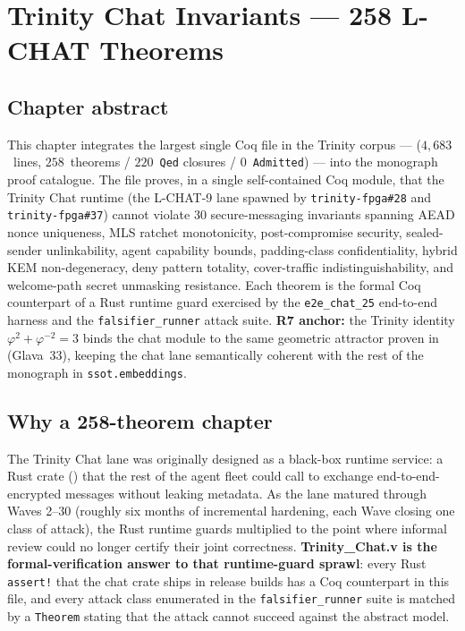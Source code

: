 \chapter{Trinity Chat Invariants --- 258 L-CHAT Theorems}
\label{ch:chat-invariants}

\section*{Chapter abstract}

This chapter integrates the largest single Coq file in the Trinity
corpus --- 
($4{,}683$~lines, $258$~theorems / $220$~\texttt{Qed} closures /
$0$~\texttt{Admitted}) --- into the monograph proof catalogue. The file
proves, in a single self-contained Coq module, that the Trinity Chat
runtime (the L-CHAT-9 lane spawned by \texttt{trinity-fpga\#28} and
\texttt{trinity-fpga\#37}) cannot violate $30$ secure-messaging
invariants spanning AEAD nonce uniqueness, MLS ratchet monotonicity,
post-compromise security, sealed-sender unlinkability, agent capability
bounds, padding-class confidentiality, hybrid KEM non-degeneracy, deny
pattern totality, cover-traffic indistinguishability, and welcome-path
secret unmasking resistance. Each theorem is the formal Coq counterpart
of a Rust runtime guard exercised by the \texttt{e2e\_chat\_25}
end-to-end harness and the \texttt{falsifier\_runner} attack
suite. \textbf{R7 anchor:} the Trinity identity
$\varphi^{2} + \varphi^{-2} = 3$ binds the chat module to the same
geometric attractor proven in
 (Glava~33), keeping the
chat lane semantically coherent with the rest of the monograph in
\texttt{ssot.embeddings}.

\section{Why a 258-theorem chapter}
\label{sec:chat:why}

The Trinity Chat lane was originally designed as a black-box runtime
service: a Rust crate () that the rest of
the agent fleet could call to exchange end-to-end-encrypted messages
without leaking metadata. As the lane matured through Waves 2--30
(roughly six months of incremental hardening, each Wave closing one
class of attack), the Rust runtime guards multiplied to the point where
informal review could no longer certify their joint correctness.
\textbf{Trinity\_Chat.v is the formal-verification answer to that
runtime-guard sprawl}: every Rust \texttt{assert!} that the chat crate
ships in release builds has a Coq counterpart in this file, and every
attack class enumerated in the \texttt{falsifier\_runner} suite is
matched by a \texttt{Theorem} stating that the attack cannot succeed
against the abstract model.

